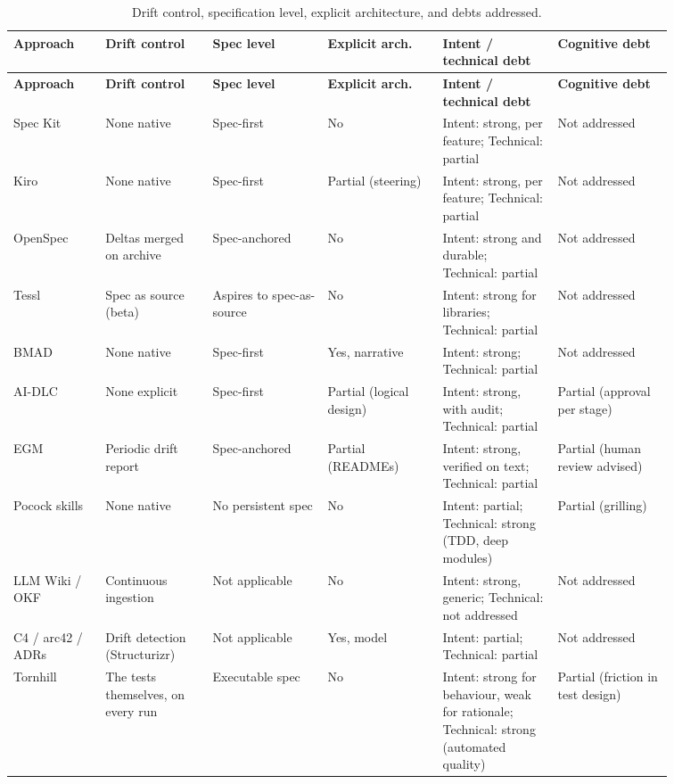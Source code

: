 \documentclass[11pt]{article}
\begin{document}
\small
\begin{longtable}{p{0.12\linewidth}p{0.14\linewidth}p{0.15\linewidth}p{0.15\linewidth}p{0.15\linewidth}p{0.15\linewidth}}
\caption{Drift control, specification level, explicit architecture, and debts addressed.}
\label{tab:results2}\\
\toprule
\textbf{Approach} & \textbf{Drift control} & \textbf{Spec level} & \textbf{Explicit arch.} & \textbf{Intent / technical debt} & \textbf{Cognitive debt} \\
\midrule
\endfirsthead
\toprule
\textbf{Approach} & \textbf{Drift control} & \textbf{Spec level} & \textbf{Explicit arch.} & \textbf{Intent / technical debt} & \textbf{Cognitive debt} \\
\midrule
\endhead
Spec Kit & None native & Spec-first & No & Intent: strong, per feature; Technical: partial & Not addressed \\
Kiro & None native & Spec-first & Partial (steering) & Intent: strong, per feature; Technical: partial & Not addressed \\
OpenSpec & Deltas merged on archive & Spec-anchored & No & Intent: strong and durable; Technical: partial & Not addressed \\
Tessl & Spec as source (beta) & Aspires to spec-as-source & No & Intent: strong for libraries; Technical: partial & Not addressed \\
BMAD & None native & Spec-first & Yes, narrative & Intent: strong; Technical: partial & Not addressed \\
AI-DLC & None explicit & Spec-first & Partial (logical design) & Intent: strong, with audit; Technical: partial & Partial (approval per stage) \\
EGM & Periodic drift report & Spec-anchored & Partial (READMEs) & Intent: strong, verified on text; Technical: partial & Partial (human review advised) \\
Pocock skills & None native & No persistent spec & No & Intent: partial; Technical: strong (TDD, deep modules) & Partial (grilling) \\
LLM Wiki / OKF & Continuous ingestion & Not applicable & No & Intent: strong, generic; Technical: not addressed & Not addressed \\
C4 / arc42 / ADRs & Drift detection (Structurizr) & Not applicable & Yes, model & Intent: partial; Technical: partial & Not addressed \\
Tornhill & The tests themselves, on every run & Executable spec & No & Intent: strong for behaviour, weak for rationale; Technical: strong (automated quality) & Partial (friction in test design) \\
\bottomrule
\end{longtable}
\normalsize
\end{document}
